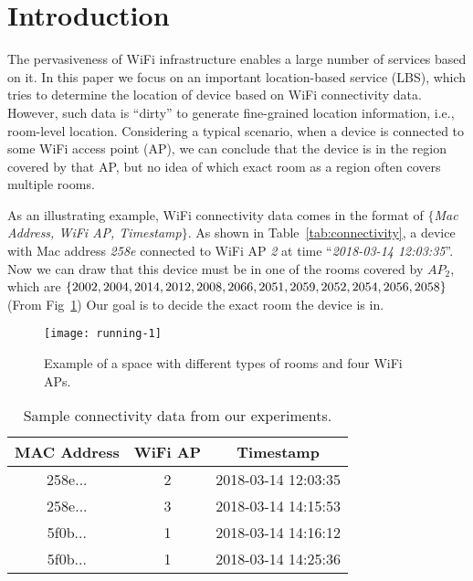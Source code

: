 \section{Introduction}
\label{sec:intro}

The pervasiveness of WiFi infrastructure enables a large number of services based on it. In this paper we focus on an important location-based service (LBS), which tries to determine the location of device based on WiFi connectivity data. However, such data is ``dirty'' to generate fine-grained location information, i.e., room-level location. Considering a typical scenario, when a device is connected to some WiFi access point (AP), we can conclude that the device is in the region covered by that AP, but no idea of which exact room as a region often covers multiple rooms. 

As an illustrating example, WiFi connectivity data comes in the format of $\{$\textit{Mac Address, WiFi AP, Timestamp}$\}$. As shown in Table~\ref{tab:connectivity}, a device with Mac address \textit{258e} connected to WiFi AP \textit{2} at time ``\textit{2018-03-14 12:03:35}''. Now we can draw that this device must be in one of the rooms covered by $AP_2$, which are  $\{2002,2004,2014,2012,2008,2066,2051,\\2059,2052,2054,2056,2058\}$ (From Fig~\ref{fig:running}) Our goal is to decide the exact room the device is in. 

\begin{figure}[!htb]
	\centering
	\vspace{-0.8em}
	\texttt{[image: running-1]}
	\caption{Example of a space with different types of rooms and four WiFi APs.}
	\label{fig:running}
\end{figure}

\begin{table}[!htb]
	\centering
	\caption{Sample connectivity data from our experiments.}
	\label{tab:connectivity}
	\label{tab:wifi}
	\begin{tabular}{|c|c|c|}
		\hline
		MAC Address & WiFi AP & Timestamp \\ \hline
		258e... & 2 & 2018-03-14 12:03:35  \\ \hline
		258e... & 3 & 2018-03-14 14:15:53 \\ \hline
		5f0b... & 1 & 2018-03-14 14:16:12 \\ \hline
		5f0b... & 1 & 2018-03-14 14:25:36 \\ \hline
	\end{tabular}
	\vspace{-0.5em}
\end{table} 